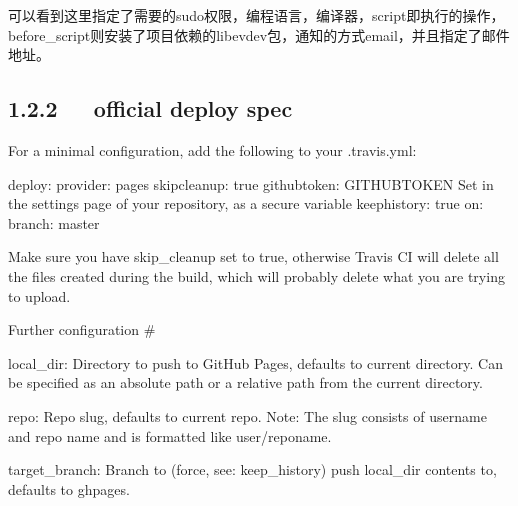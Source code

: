 \documentclass[letterpaper,12pt,english]{sphinxmanual}
\begin{document}
\begin{sphinxVerbatim}[commandchars=\\\{\}]
 
 
 
    
 
       
     
     
\end{sphinxVerbatim}

可以看到这里指定了需要的sudo权限，编程语言，编译器，script即执行的操作，before\_script则安装了项目依赖的libev\sphinxhyphen{}dev包，通知的方式email，并且指定了邮件地址。


\subsection{1.2.2   official deploy spec}
\label{\detokenize{001software/001install/001._u7f51_u7ad9/travisCI:official-deploy-spec}}
For a minimal configuration, add the following to your .travis.yml:

\begin{sphinxVerbatim}[commandchars=\\\{\}]
deploy:
  provider: pages
  skip\PYGZus{}cleanup: true
  github\PYGZus{}token: \PYGZdl{}GITHUB\PYGZus{}TOKEN  \PYGZsh{} Set in the settings page of your repository,    as a secure variable
  keep\PYGZus{}history: true
  on:
    branch: master
\end{sphinxVerbatim}

Make sure you have skip\_cleanup set to true, otherwise Travis CI will delete all the files created during the build, which will probably delete what you are trying to upload.

Further configuration \#

local\_dir: Directory to push to GitHub Pages, defaults to current directory. Can be specified as an absolute path or a relative path from the current directory.

repo: Repo slug, defaults to current repo. Note: The slug consists of username and repo name and is formatted like user/repo\sphinxhyphen{}name.

target\_branch: Branch to (force, see: keep\_history) push local\_dir contents to, defaults to gh\sphinxhyphen{}pages.
\end{document}
